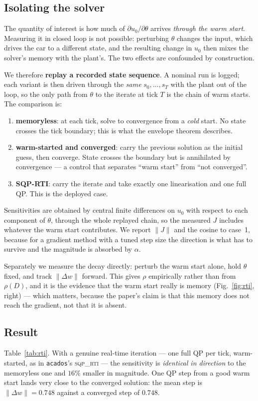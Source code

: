 \documentclass[letterpaper, 10 pt, conference]{ieeeconf}
\begin{document}
\subsection{Isolating the solver}
The quantity of interest is how much of $\partial u_0/\partial\theta$ arrives
\emph{through the warm start}. Measuring it in closed loop is not possible:
perturbing $\theta$ changes the input, which drives the car to a different
state, and the resulting change in $u_0$ then mixes the solver's memory with
the plant's. The two effects are confounded by construction.

We therefore \textbf{replay a recorded state sequence}. A nominal run is logged;
each variant is then driven through the \emph{same} $s_0,\dots,s_T$ with the
plant out of the loop, so the only path from $\theta$ to the iterate at tick $T$
is the chain of warm starts. The comparison is:
\begin{enumerate}
  \item \textbf{memoryless}: at each tick, solve to convergence from a
        \emph{cold} start. No state crosses the tick boundary; this is what the
        envelope theorem describes.
  \item \textbf{warm-started and converged}: carry the previous solution as the
        initial guess, then converge. State crosses the boundary but is
        annihilated by convergence --- a control that separates ``warm start''
        from ``not converged''.
  \item \textbf{SQP-RTI}: carry the iterate and take exactly one linearisation
        and one full QP. This is the deployed case.
\end{enumerate}
Sensitivities are obtained by central finite differences on $u_0$ with respect
to each component of $\theta$, through the whole replayed chain, so the measured
$J$ includes whatever the warm start contributes. We report $\lVert J\rVert$ and
the cosine to case~1, because for a gradient method with a tuned step size the
direction is what has to survive and the magnitude is absorbed by $\alpha$.

Separately we measure the decay directly: perturb the warm start alone, hold
$\theta$ fixed, and track $\lVert\Delta w\rVert$ forward. This gives $\rho$
empirically rather than from $\rho(D)$, and it is the evidence that the warm
start really is memory (Fig.~\ref{fig:rti}, right) --- which matters, because the
paper's claim is that this memory does not reach the gradient, not that it is
absent.

\subsection{Result}
Table~\ref{tab:rti}. With a genuine real-time iteration --- one full QP per
tick, warm-started, as in \texttt{acados}'s \textsc{sqp\_rti} --- the
sensitivity is \emph{identical in direction} to the memoryless one and $16\%$
smaller in magnitude. One QP step from a good warm start lands very close to
the converged solution: the mean step is $\lVert\Delta w\rVert = 0.748$ against
a converged step of $0.748$.
\end{document}
